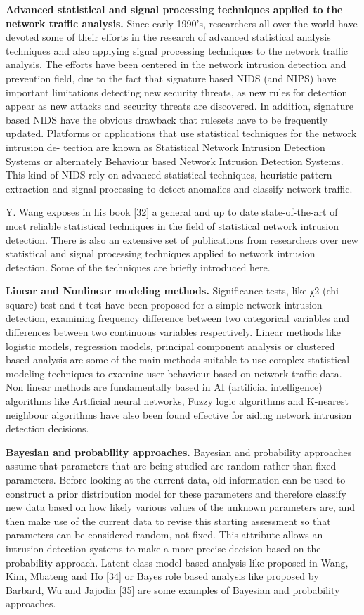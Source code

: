 \documentclass[thesis=M,english]{FITthesis}[2011/07/15]
\begin{document}
\textbf{Advanced statistical and signal processing techniques applied to the network traffic analysis.}
Since early 1990’s, researchers all over the world have devoted some of their efforts in the research of advanced statistical analysis techniques and also applying signal processing techniques to the network traffic analysis. The efforts have been centered in the network intrusion detection and prevention field, due to the fact that signature based NIDS (and NIPS) have important limitations detecting new security threats, as new rules for detection appear as new attacks and security threats are discovered. In addition,
signature based NIDS have the obvious drawback that rulesets have to be frequently updated. Platforms or applications that use statistical techniques for the network intrusion de-
tection are known as Statistical Network Intrusion Detection Systems or alternately Behaviour based Network Intrusion Detection Systems. This kind of NIDS rely on advanced statistical techniques, heuristic pattern extraction and signal processing to detect anomalies and classify network traffic.

Y. Wang exposes in his book [32] a general and up to date state-of-the-art of most reliable statistical techniques in the field of statistical network intrusion detection. There
is also an extensive set of publications from researchers over new statistical and signal processing techniques applied to network intrusion detection. Some of the techniques
are briefly introduced here.

\textbf{Linear and Nonlinear modeling methods.}
Significance tests, like χ2 (chi-square) test and t-test have been proposed for a simple network intrusion detection, examining frequency difference between two categorical variables and differences between two continuous variables respectively. Linear methods like logistic models, regression models, principal component analysis or clustered based analysis are some of the main methods suitable to use complex statistical modeling techniques to examine user behaviour based on network traffic data. 
Non linear methods are fundamentally based in AI (artificial intelligence) algorithms like Artificial neural networks, Fuzzy logic algorithms and K-nearest neighbour algorithms have also been found effective for aiding network intrusion detection decisions.

\textbf{Bayesian and probability approaches.}
Bayesian and probability approaches assume that parameters that are being studied are random rather than fixed parameters. Before looking at the current data, old information can be used to construct a prior distribution model for these parameters and therefore classify new data based on how likely various values of the unknown parameters are, and then make use of the current data to revise this starting assessment so that parameters can be considered random, not fixed. This attribute allows an intrusion detection systems to make a more precise decision based on the probability approach. Latent class model based analysis like proposed in Wang, Kim, Mbateng and Ho [34] or Bayes role based analysis like proposed by Barbard, Wu and Jajodia [35] are some examples of Bayesian and probability approaches.
\end{document}
